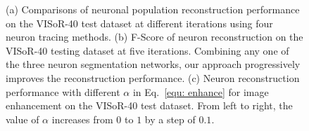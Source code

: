 \begin{figure}[t]
	\centering
	\caption{
	(a) Comparisons of neuronal population reconstruction performance on the VISoR-40 test dataset at different iterations using four neuron tracing methods.
	(b) F-Score of neuron reconstruction on the VISoR-40 testing dataset at five iterations. Combining any one of the three neuron segmentation networks, our approach progressively improves the reconstruction performance.
	(c) Neuron reconstruction performance with different $\alpha$ in Eq.~\eqref{equ: enhance} for image enhancement on the VISoR-40 test dataset. From left to right, the value of $\alpha$ increases from $0$ to $1$ by a step of $0.1$.}
	\label{fig:tracing_performance_plnpr}
\end{figure}


